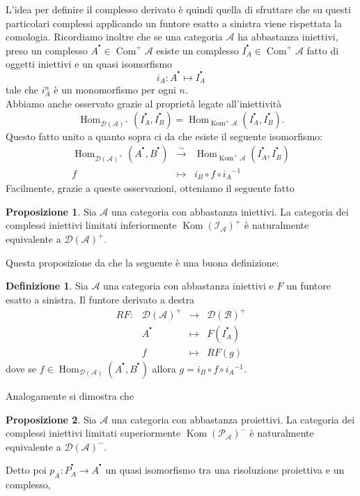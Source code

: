 \documentclass[a4paper,11pt,oneside]{book}
\newcommand{\inverti}[1]{{#1}^{-1}}
\newcommand{\A}{\mathcal{A}}
\newcommand{\B}{\mathcal{B}}
\newcommand{\der}[1]{\mathcal{D}(#1)}
\newcommand{\complx}[1]{#1^{^\bullet}}
\DeclareMathOperator{\Hom}{Hom}
\DeclareMathOperator{\Kom}{Kom}
\DeclareMathOperator{\Com}{Com}
\theoremstyle{definition}
\newtheorem{de}{Definizione}
\newtheorem{prop}{Proposizione}
\begin{document}
	 L'idea per definire il complesso derivato è quindi quella di sfruttare che su questi particolari complessi 
	 applicando un funtore esatto a sinistra viene rispettata la comologia. Ricordiamo inoltre
	 che se una categoria $\A$ ha abbastanza iniettivi, preso un complesso $\complx{A}\in\Com^+\A$ esiste un complesso
	 $\complx{I}_A\in\Com^+\A$ fatto di oggetti iniettivi e un quasi isomorfismo 
	 \[
	  i_A\colon\complx{A}\longmapsto\complx{I}_A
	 \]
	  tale che $i_A^n$ è un monomorfismo per ogni $n$.\\
	  Abbiamo anche osservato grazie al proprietà legate all'iniettività
	  $$\Hom_{\der\A^+}(\complx{I_A},\complx{I_B})=\Hom_{\Kom^+\A}(\complx{I_A},\complx{I_B}).$$
	  \noindent
	  Questo fatto unito a quanto
	  sopra ci da che esiste il seguente isomorfismo:
	  \[
	  \begin{matrix}
	  \Hom_{\der\A^+}(\complx{A},\complx{B})& \xrightarrow {\sim} &\Hom_{\Kom^+\A}(\complx{I_A},\complx{I_B})\\
	  f&\longmapsto& i_B\circ f\circ \inverti{i_A}
	  \end{matrix}
	  \]
	  Facilmente, grazie a queste osservazioni, otteniamo il seguente fatto
	  \begin{prop}\label{prop:eqiniett}
	   Sia  $\A$ una categoria con abbastanza iniettivi. La categoria 
	   dei complessi iniettivi limitati inferiormente $\Kom(\mathcal{I}_{\A})^+$ è naturalmente 
	   equivalente a $\der{\A}^+$.
	  \end{prop}
	  Questa proposizione da che la seguente è una buona definizione:
	\begin{de}
	 Sia  $\A$ una categoria con abbastanza iniettivi e $F$ un funtore esatto a sinistra. Il
	 funtore derivato a destra
	\[\begin{matrix}
	   RF\colon &\der\A^+&\longrightarrow &\der\B^+\\
		    &\complx{A}&\longmapsto& F(\complx{I}_A)\\
		    &f&\mapsto & RF(g)
	  \end{matrix}
	\]
	dove se $f\in\Hom_{\der\A}(\complx{A},\complx{B})$ allora
	$g=i_B\circ f\circ \inverti{i_A}$.
	\end{de}
	Analogamente si dimostra che
	\begin{prop}
	   Sia  $\A$ una categoria con abbastanza proiettivi. La categoria 
	   dei complessi iniettivi limitati superiormente $\Kom(\mathcal{P}_{\A})^-$ è naturalmente 
	   equivalente a $\der{\A}^-$.
	  \end{prop}
	 Detto poi $p_A\colon\complx{P}_A\rightarrow\complx{A}$ un quasi isomorfismo tra una risoluzione proiettiva e un complesso, 
\end{document}

